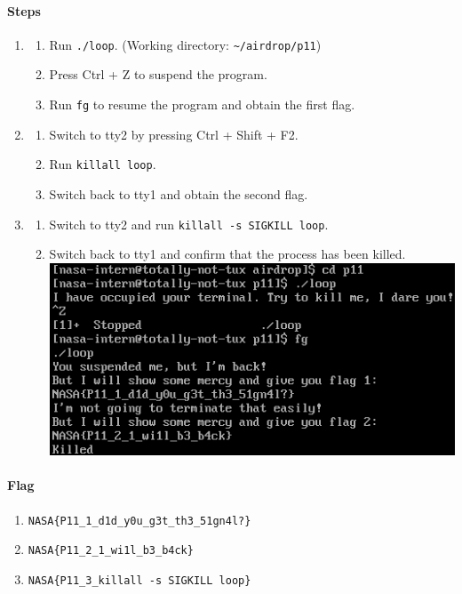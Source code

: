 \documentclass[12pt, a4paper]{article}
\begin{document}
  \paragraph{Steps}
  \begin{enumerate}
    \item
    \begin{enumerate}
      \item Run \verb|./loop|. (Working directory: \verb|~/airdrop/p11|)
      \item Press Ctrl + Z to suspend the program.
      \item Run \verb|fg| to resume the program and obtain the first flag.
    \end{enumerate}
    \item
    \begin{enumerate}
      \item Switch to tty2 by pressing Ctrl + Shift + F2.
      \item Run \verb|killall loop|.
      \item Switch back to tty1 and obtain the second flag.
    \end{enumerate}
    \item
    \begin{enumerate}
      \item Switch to tty2 and run \verb|killall -s SIGKILL loop|.
      \item Switch back to tty1 and confirm that the process has been killed.\\
        \includegraphics[width=0.9\linewidth]{sa_p11.png}
    \end{enumerate}
  \end{enumerate}
  \paragraph{Flag}
  \begin{enumerate}
    \item \verb|NASA{P11_1_d1d_y0u_g3t_th3_51gn4l?}|
    \item \verb|NASA{P11_2_1_wi1l_b3_b4ck}|
    \item \verb|NASA{P11_3_killall -s SIGKILL loop}|
  \end{enumerate}
\end{document}
